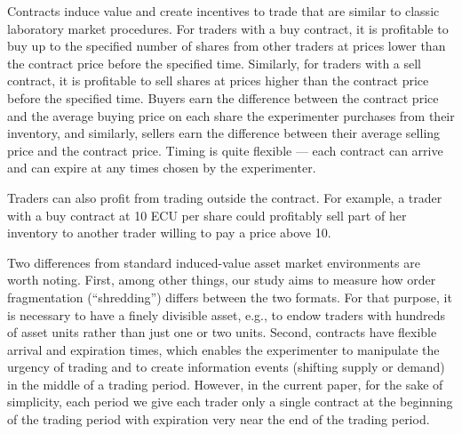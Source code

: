 \documentclass[12pt]{article}
\begin{document}
Contracts induce value and create incentives to trade that are similar to classic laboratory market procedures.
For traders with a buy contract, it is profitable to buy up to the specified number of shares from other traders at prices lower than the contract price before the specified time. 
Similarly, for traders with a sell contract, it is profitable to sell shares at prices higher than the contract price before the specified time. 
Buyers earn the difference between the contract price and the average buying price on each share the experimenter purchases from their  inventory, and similarly, sellers  earn the difference between their average selling price and the contract price. 
Timing is quite flexible --- each contract can arrive and can expire at any times chosen by the experimenter. 

Traders can also profit from trading outside the contract. For example, a trader with a buy contract at 10 ECU per share could profitably sell part of her inventory to another trader willing to pay a price above 10. 

Two differences from standard induced-value asset market environments are worth noting. First, among other things, our study aims to measure how order fragmentation (``shredding'') differs between the two formats. For that purpose, it is necessary to have a finely divisible asset, e.g., to endow traders with hundreds of asset units rather than just one or two units.  
Second, contracts  have flexible arrival and expiration times, which enables the experimenter to manipulate the urgency of trading and to create information events (shifting supply or demand) in the middle of a trading period. However, in the current paper, for the sake of simplicity, each period we give each trader only a single contract at the beginning of the trading period with expiration very near the end of the trading period. 

\end{document}
